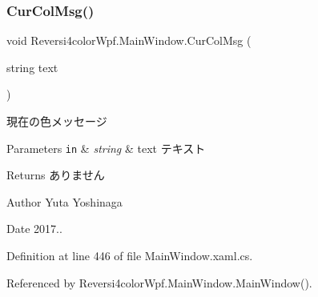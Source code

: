 \subsubsection{\texorpdfstring{Cur\+Col\+Msg()}{CurColMsg()}}
{\footnotesize\ttfamily void Reversi4color\+Wpf.\+Main\+Window.\+Cur\+Col\+Msg (\begin{DoxyParamCaption}\item[{string}]{text }\end{DoxyParamCaption})}



現在の色メッセージ 


\begin{DoxyParams}[1]{Parameters}
\mbox{\tt in}  & {\em string} & text テキスト \\
\hline
\end{DoxyParams}
\begin{DoxyReturn}{Returns}
ありません 
\end{DoxyReturn}
\begin{DoxyAuthor}{Author}
Yuta Yoshinaga 
\end{DoxyAuthor}
\begin{DoxyDate}{Date}
2017.. 
\end{DoxyDate}


Definition at line 446 of file Main\+Window.\+xaml.\+cs.



Referenced by Reversi4color\+Wpf.\+Main\+Window.\+Main\+Window().

